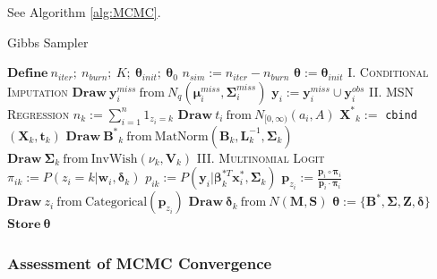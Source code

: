 \documentclass[useAMS,referee]{biom}
\begin{document}
See Algorithm \ref{alg:MCMC}.

\begin{algorithm}
\caption{Gibbs Sampler}
\label{alg:MCMC}
\begin{algorithmic}
\small
\linespread{0.5}
    \State $\mathbf{Define} \ n_{iter};\  n_{burn}; \ K; \ \boldsymbol\theta_{init}; \ \boldsymbol\theta_0$
    \State $n_{sim} := n_{iter} - n_{burn}$
    \State $\boldsymbol\theta := \boldsymbol\theta_{init}$
        \State \textsc{I. Conditional Imputation}
            \State $\mathbf{Draw} \ \mathbf{y}_i^{miss} \ \text{from} \ N_q(\boldsymbol\mu_i^{miss}, \boldsymbol\Sigma_i^{miss})$
            \State $\mathbf{y}_i := \mathbf{y}_i^{miss} \cup \mathbf{y}_i^{obs}$
         \EndFor
        \State \textsc{II. MSN Regression}
            \State $n_k := \sum_{i = 1}^n {1}_{z_i = k}$
              \State $\mathbf{Draw}\  t_i \ \text{from} \ N_{[0,\infty)}(a_i,A)$
            \EndFor
            \State $\mathbf{X^*}_k := $ \texttt{cbind}$(\mathbf{X}_k,\mathbf{t}_k)$
            \State $\mathbf{Draw} \ \mathbf{B^*}_k \ \text{from} \ \text{MatNorm}(\mathbf{B}_k,\mathbf{L}_k^{-1},\boldsymbol\Sigma_k)$
            \State $\mathbf{Draw} \ \boldsymbol\Sigma_k \ \text{from} \ \text{InvWish}(\nu_k, \mathbf{V}_k)$
          \EndFor
        \State \textsc{III. Multinomial Logit}
              \State $\pi_{ik} := P(z_i = k|\mathbf{w}_i,\boldsymbol\delta_k)$
              \State $p_{ik} := P(\mathbf{y}_i|\boldsymbol\beta_k^{*T} \mathbf{x}^*_i,\boldsymbol\Sigma_k)$
            \EndFor
            \State $\mathbf{p}_{z_i} := \frac{\mathbf{p}_i \circ \boldsymbol\pi_i}{\mathbf{p}_i \cdot \boldsymbol\pi_i}$
            \State $\mathbf{Draw} \ z_i \ \text{from} \ \text{Categorical}(\mathbf{p}_{z_i})$
              \State $\mathbf{Draw} \ \boldsymbol\delta_k \ \text{from} \ N(\mathbf{M},\mathbf{S})$
            \EndFor
          \EndFor
        \State $\boldsymbol\theta := \{\mathbf{B^*}, \boldsymbol\Sigma, \mathbf{Z}, \boldsymbol\delta \}$
        \State $\mathbf{Store} \ \boldsymbol\theta$
	  \EndFor
\end{algorithmic}
\end{algorithm}


\subsubsection{Assessment of MCMC Convergence}
\end{document}
